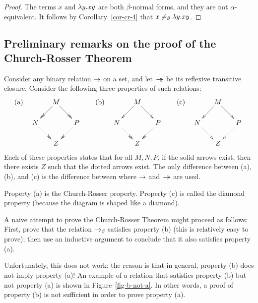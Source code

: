\documentclass{article}
\begin{document}
\begin{proof}
  The terms $x$ and $\lambda y.xy$ are both $\beta$-normal forms, and
  they are not $\alpha$-equivalent. It follows by
  Corollary~\ref{cor-cr-4} that $x\not=_{\beta} \lambda y.xy$. \eot
\end{proof}

\subsection{Preliminary remarks on the proof of the Church-Rosser Theorem}
\label{subsec-prelim-cr}

Consider any binary relation $\rightarrow$ on a set, and let $\mathrel{\rightarrow\!\!\!\!\!\rightarrow}$ be its
reflexive transitive closure. Consider the following three
properties of such relations:
\[ \mbox{(a)} \ssep \xymatrix@dr{M\ar@{->>}[r]\ar@{->>}[d] & P\ar@{.>>}[d]\\ N\ar@{.>>}[r] & Z}
\sep
\mbox{(b)} \ssep \xymatrix@dr{M\ar@{->}[r]\ar@{->}[d] & P\ar@{.>>}[d]\\ N\ar@{.>>}[r] & Z}
\sep
\mbox{(c)} \ssep \xymatrix@dr{M\ar@{->}[r]\ar@{->}[d] & P\ar@{.>}[d]\\ N\ar@{.>}[r] & Z}
\]
Each of these properties states that for all $M,N,P$, if the solid
arrows exist, then there exists $Z$ such that the dotted arrows exist.
The only difference between (a), (b), and (c) is the difference
between where $\rightarrow$ and $\mathrel{\rightarrow\!\!\!\!\!\rightarrow}$ are used.

Property (a) is the Church-Rosser property. Property (c) is called the
diamond property (because the diagram is shaped like a diamond).

A naive attempt to prove the Church-Rosser Theorem might proceed as
follows: First, prove that the relation $\rightarrow_{\beta}$ satisfies property (b)
(this is relatively easy to prove); then use an inductive argument to
conclude that it also satisfies property (a). 

Unfortunately, this does not work: the reason is that in general,
property (b) does not imply property (a)! An example of a relation
that satisfies property (b) but not property (a) is shown in
Figure~\ref{fig-b-not-a}. In other words, a proof of property (b) is
not sufficient in order to prove property (a). 
\end{document}
